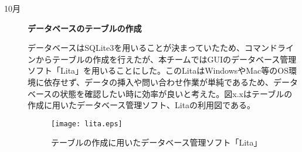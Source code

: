 ﻿\begin{description}
 \item[10月] \textbf{データベースのテーブルの作成}\par
データベースはSQLite3を用いることが決まっていたため、コマンドラインからテーブルの作成を行えたが、本チームではGUIのデータベース管理ソフト「Lita」を用いることにした。このLitaはWindowsやMac等のOS環境に依存せず、データの挿入や問い合わせ作業が単純であるため、データベースの状態を確認したい時に効率が良いと考えた。図x.xはテーブルの作成に用いたデータベース管理ソフト、Litaの利用図である。

 \begin{figure}[h]
 \centering
 \texttt{[image: lita.eps]}
 \caption{テーブルの作成に用いたデータベース管理ソフト「Lita」}
 \label{fig:one}
 \end{figure}
 \par

\end{description}
